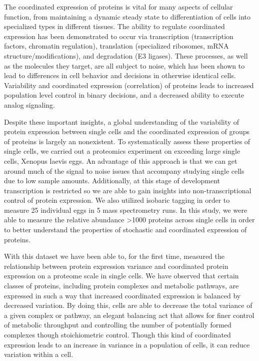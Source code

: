 \documentclass[11pt,]{article}
\begin{document}
The coordinated expression of proteins is vital for many aspects of
cellular function, from maintaining a dynamic steady state to
differentiation of cells into specialized types in different tissues.
The ability to regulate coordinated expression has been demonstrated to
occur via transcription (transcription factors, chromatin regulation),
translation (specialized ribosomes, mRNA structure/modifications), and
degradation (E3 ligases). These processes, as well as the molecules they
target, are all subject to noise, which has been shown to lead to
differences in cell behavior and decisions in otherwise identical cells.
Variability and coordinated expression (correlation) of proteins leads
to increased population level control in binary decisions, and a
decreased ability to execute analog signaling.

Despite these important insights, a global understanding of the
variability of protein expression between single cells and the
coordinated expression of groups of proteins is largely an nonexistent.
To systematically assess these properties of single cells, we carried
out a proteomics experiment on exceeding large single cells, Xenopus
laevis eggs. An advantage of this approach is that we can get around
much of the signal to noise issues that accompany studying single cells
due to low sample amounts. Additionally, at this stage of development
transcription is restricted so we are able to gain insights into
non-transcriptional control of protein expression. We also utilized
isobaric tagging in order to measure 25 individual eggs in 5 mass
spectrometry runs. In this study, we were able to measure the relative
abundance \textgreater{}1000 proteins across single cells in order to
better understand the properties of stochastic and coordinated
expression of proteins.

With this dataset we have been able to, for the first time, measured the
relationship between protein expression variance and coordinated protein
expression on a proteome scale in single cells. We have observed that
certain classes of proteins, including protein complexes and metabolic
pathways, are expressed in such a way that increased coordinated
expression is balanced by decreased variation. By doing this, cells are
able to decrease the total variance of a given complex or pathway, an
elegant balancing act that allows for finer control of metabolic
throughput and controlling the number of potentially formed complexes
though stoichiometric control. Though this kind of coordinated
expression leads to an increase in variance in a population of cells, it
can reduce variation within a cell.
\end{document}
